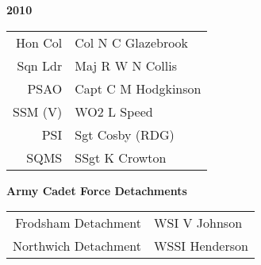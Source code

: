 \begin{center}
  \Huge
  \textbf{2010}
\end{center}

\begin{center}
  \small
  \begin{tabular}{rl}
    Hon Col & Col N C Glazebrook \\
    Sqn Ldr & Maj R W N Collis \\
    PSAO & Capt C M Hodgkinson \\
    SSM (V) & WO2 L Speed \\
    PSI & Sgt Cosby (RDG) \\
    SQMS & SSgt K Crowton \\
  \end{tabular}
\end{center}

\begin{center}
  \large
  \textbf{Army Cadet Force Detachments}
\end{center}

\begin{center}
  \small
  \begin{tabular}{rl}
    Frodsham Detachment & WSI V Johnson \\
    Northwich Detachment & WSSI Henderson \\
  \end{tabular}
\end{center}

\vspace{80mm}

\pagebreak

